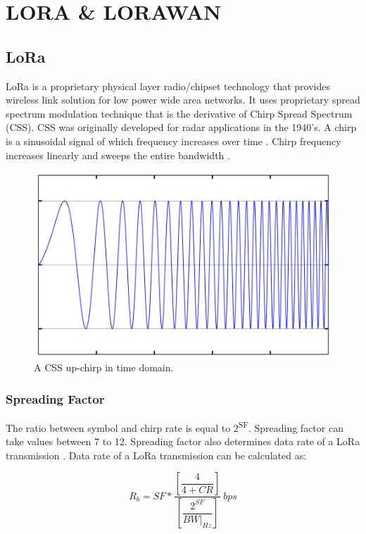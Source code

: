 \chapter{LORA \& LORAWAN}\label{ch:lora_lorawan}

\section{LoRa}

LoRa is a proprietary physical layer radio/chipset technology that provides wireless link solution for low power wide area networks. It uses proprietary spread spectrum modulation technique that is the derivative of Chirp Spread Spectrum (CSS). CSS was originally developed for radar applications in the 1940’s. A chirp is a sinusoidal signal of which frequency increases over time \cite{1091721}. Chirp frequency increases linearly and sweeps the entire bandwidth \cite{AN1200.22}.

\begin{figure}[h]
\centering
\includegraphics[width=.6\linewidth]{fig/lora_chirp.png}
\vspace*{5mm}
\caption{A CSS up-chirp in time domain. \cite{sghoslya_lora}}
\label{fig:lora_chirp}
\end{figure}

\subsection{Spreading Factor}

The ratio between symbol and chirp rate is equal to $2$\textsuperscript{SF}. Spreading factor can take values between 7 to 12. Spreading factor also determines data rate of a LoRa transmission \cite{AN1200.22}. Data rate of a LoRa transmission can be calculated as:

\begin{equation} \label{eq:bit_rate_sf}
R_{b} = SF * \dfrac{\left[ \dfrac{4}{4+CR} \right] }{ \left[ \dfrac{2^{SF}}{BW|_{Hz}} \right]} \ bps
\end{equation}

